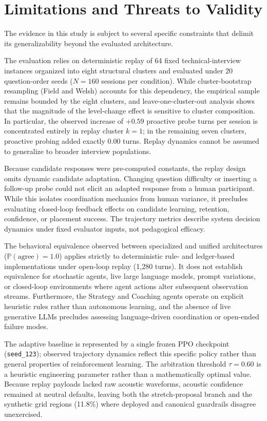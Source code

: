 \section{Limitations and Threats to Validity}\label{sec:limits}
The evidence in this study is subject to several specific constraints that delimit its generalizability beyond the evaluated architecture.

The evaluation relies on deterministic replay of 64 fixed technical-interview instances organized into eight structural clusters and evaluated under 20 question-order seeds ($N = 160$ sessions per condition). While cluster-bootstrap resampling (Field and Welsh) accounts for this dependency, the empirical sample remains bounded by the eight clusters, and leave-one-cluster-out analysis shows that the magnitude of the level-change effect is sensitive to cluster composition. In particular, the observed increase of $+0.59$ proactive probe turns per session is concentrated entirely in replay cluster $k=1$; in the remaining seven clusters, proactive probing added exactly 0.00 turns. Replay dynamics cannot be assumed to generalize to broader interview populations.

Because candidate responses were pre-computed constants, the replay design omits dynamic candidate adaptation. Changing question difficulty or inserting a follow-up probe could not elicit an adapted response from a human participant. While this isolates coordination mechanics from human variance, it precludes evaluating closed-loop feedback effects on candidate learning, retention, confidence, or placement success. The trajectory metrics describe system decision dynamics under fixed evaluator inputs, not pedagogical efficacy.

The behavioral equivalence observed between specialized and unified architectures ($\mathbb{P}(\text{agree}) = 1.0$) applies strictly to deterministic rule- and ledger-based implementations under open-loop replay (1,280 turns). It does not establish equivalence for stochastic agents, live large language models, prompt variations, or closed-loop environments where agent actions alter subsequent observation streams. Furthermore, the Strategy and Coaching agents operate on explicit heuristic rules rather than autonomous learning, and the absence of live generative LLMs precludes assessing language-driven coordination or open-ended failure modes.

The adaptive baseline is represented by a single frozen PPO checkpoint (\texttt{seed\_123}); observed trajectory dynamics reflect this specific policy rather than general properties of reinforcement learning. The arbitration threshold $\tau = 0.60$ is a heuristic engineering parameter rather than a mathematically optimal value. Because replay payloads lacked raw acoustic waveforms, acoustic confidence remained at neutral defaults, leaving both the stretch-proposal branch and the synthetic grid regions (11.8\%) where deployed and canonical guardrails disagree unexercised.

